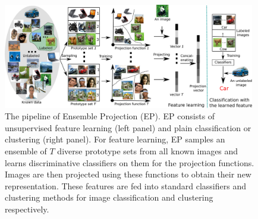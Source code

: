 

\begin{figure}[t]
  \centering
  \includegraphics[width=0.98\textwidth]{./ensemble/pipeline.jpg}
  \caption{The pipeline of Ensemble Projection (EP). EP consists of
    unsupervised feature learning (left panel) and plain
    classification or clustering (right panel). For feature learning,
    EP samples an ensemble of $T$ diverse prototype sets from all
    known images and learns discriminative classifiers on them for the
    projection functions. Images are then projected using these
    functions to obtain their new representation. These features are
    fed into standard classifiers and clustering methods for image
    classification and clustering respectively.}
\label{en:fig:pipeline}
\end{figure}


